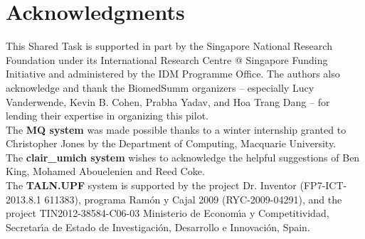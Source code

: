 \documentclass[11pt]{article}
\begin{document}
\section{Acknowledgments}
 This Shared Task is supported in part by the Singapore National
 Research Foundation under its International Research Centre @
 Singapore Funding Initiative and administered by the IDM Programme
 Office.  The authors also acknowledge and thank the BiomedSumm
 organizers -- especially Lucy Vanderwende, Kevin B. Cohen, Prabha
 Yadav, and Hoa Trang Dang -- for lending their expertise in
 organizing this pilot.\\ The {\bf MQ system} was made possible thanks
 to a winter internship granted to Christopher Jones by the Department
 of Computing, Macquarie University. \\ The {\bf clair\_umich system}
 wishes to acknowledge the helpful suggestions of Ben King, Mohamed
 Abouelenien and Reed Coke. \\ The {\bf TALN.UPF} system is supported
 by the project Dr. Inventor (FP7-ICT-2013.8.1 611383), programa
 Ram\'on y Cajal 2009 (RYC-2009-04291), and the project
 TIN2012-38584-C06-03 Ministerio de Econom\'{\i}a y Competitividad,
 Secretar\'{\i}a de Estado de Investigaci\'on, Desarrollo e
 Innovaci\'on, Spain.


\end{document}
